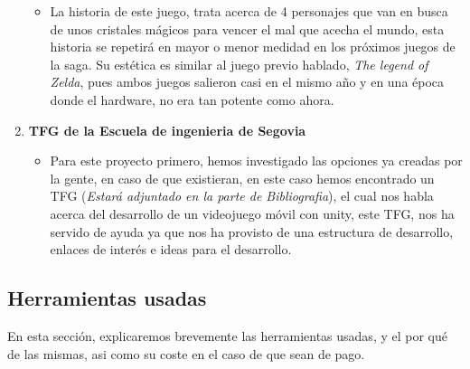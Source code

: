 \documentclass[a4paper]{article}
\begin{document}
\begin{enumerate}
\begin{itemize}
              \item La historia de este juego, trata acerca de 4 personajes que van en busca de unos cristales mágicos para vencer el mal que acecha el mundo, esta historia se repetirá en mayor o menor medidad en los próximos juegos de la saga. Su estética es similar al juego previo hablado, \textit{The legend of Zelda}, pues ambos juegos salieron casi en el mismo año y en una época donde el hardware, no era tan potente como ahora.
          \end{itemize}
    \item \textbf{TFG de la Escuela de ingenieria de Segovia}
          \begin{itemize}
              \item Para este proyecto primero, hemos investigado las opciones ya creadas por la gente, en caso de que existieran, en este caso hemos encontrado un TFG (\textit{Estará adjuntado en la parte de Bibliografia}), el cual nos habla acerca del desarrollo de un videojuego móvil con unity, este TFG, nos ha servido de ayuda ya que nos ha provisto de una estructura de desarrollo, enlaces de interés e ideas para el desarrollo.
          \end{itemize}
\end{enumerate}

\subsection{Herramientas usadas}
En esta sección, explicaremos brevemente las herramientas usadas, y el por qué de las mismas, asi como su coste en el caso de que sean de pago.
\end{document}
